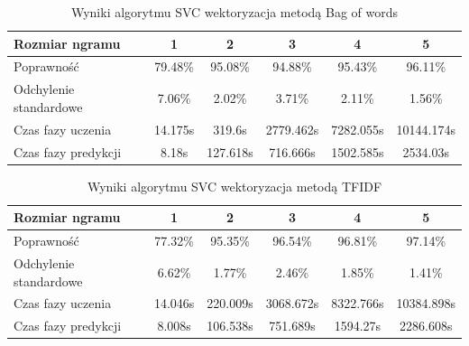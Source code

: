 \begin{table}[H]
    \centering
    \caption{Wyniki algorytmu Naive Bayes wektoryzacja metodą TFIDF}
\end{table}

\begin{table}[H]
    \centering
    \caption{Wyniki algorytmu SVC wektoryzacja metodą Bag of words}
    \begin{tabular}{ | l | c | c | c | c | c |}
        \hline
        Rozmiar ngramu & 1 & 2 & 3 & 4 & 5 \\ \hline
        Poprawność & 79.48\% & 95.08\% & 94.88\% & 95.43\% & 96.11\%   \\ \hline
        Odchylenie standardowe & 7.06\% & 2.02\% & 3.71\% & 2.11\% & 1.56\%  \\ \hline
        Czas fazy uczenia & 14.175s & 319.6s & 2779.462s & 7282.055s & 10144.174s  \\ \hline
        Czas fazy predykcji & 8.18s & 127.618s & 716.666s & 1502.585s & 2534.03s  \\ \hline
    \end{tabular}
\end{table}

\begin{table}[H]
    \centering
    \caption{Wyniki algorytmu SVC wektoryzacja metodą TFIDF}
    \begin{tabular}{ | l | c | c | c | c | c |}
        \hline
        Rozmiar ngramu & 1 & 2 & 3 & 4 & 5   \\ \hline
        Poprawność & 77.32\% & 95.35\% & 96.54\% & 96.81\% & 97.14\% \\ \hline
        Odchylenie standardowe & 6.62\% & 1.77\% & 2.46\% & 1.85\% & 1.41\%  \\ \hline
        Czas fazy uczenia & 14.046s & 220.009s & 3068.672s & 8322.766s & 10384.898s \\ \hline
        Czas fazy predykcji & 8.008s & 106.538s & 751.689s & 1594.27s & 2286.608s  \\ \hline
    \end{tabular}
\end{table}

